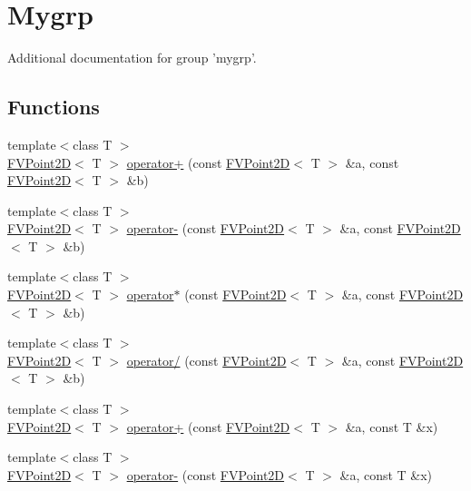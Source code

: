 \hypertarget{group__mygrp}{
\section{Mygrp}
\label{d5/d04/group__mygrp}
}


Additional documentation for group 'mygrp'.  


\subsection*{Functions}
\begin{DoxyCompactItemize}
\item 
{\footnotesize template$<$class T $>$ }\\\hyperlink{classFVPoint2D}{FVPoint2D}$<$ T $>$ \hyperlink{group__mygrp_ga62bcbe7f8a0a6b8f5a3197cb13bb77cf}{operator+} (const \hyperlink{classFVPoint2D}{FVPoint2D}$<$ T $>$ \&a, const \hyperlink{classFVPoint2D}{FVPoint2D}$<$ T $>$ \&b)
\item 
{\footnotesize template$<$class T $>$ }\\\hyperlink{classFVPoint2D}{FVPoint2D}$<$ T $>$ \hyperlink{group__mygrp_ga7d5cb24f219876bf12dc09b7bf61aced}{operator-\/} (const \hyperlink{classFVPoint2D}{FVPoint2D}$<$ T $>$ \&a, const \hyperlink{classFVPoint2D}{FVPoint2D}$<$ T $>$ \&b)
\item 
{\footnotesize template$<$class T $>$ }\\\hyperlink{classFVPoint2D}{FVPoint2D}$<$ T $>$ \hyperlink{group__mygrp_gadbed70591d9eda691e7b13d65522442a}{operator$\ast$} (const \hyperlink{classFVPoint2D}{FVPoint2D}$<$ T $>$ \&a, const \hyperlink{classFVPoint2D}{FVPoint2D}$<$ T $>$ \&b)
\item 
{\footnotesize template$<$class T $>$ }\\\hyperlink{classFVPoint2D}{FVPoint2D}$<$ T $>$ \hyperlink{group__mygrp_ga2744005a9d13a03dbd598b60efb9e886}{operator/} (const \hyperlink{classFVPoint2D}{FVPoint2D}$<$ T $>$ \&a, const \hyperlink{classFVPoint2D}{FVPoint2D}$<$ T $>$ \&b)
\item 
{\footnotesize template$<$class T $>$ }\\\hyperlink{classFVPoint2D}{FVPoint2D}$<$ T $>$ \hyperlink{group__mygrp_gac45bd75690254ff12861d49e8f099eef}{operator+} (const \hyperlink{classFVPoint2D}{FVPoint2D}$<$ T $>$ \&a, const T \&x)
\item 
{\footnotesize template$<$class T $>$ }\\\hyperlink{classFVPoint2D}{FVPoint2D}$<$ T $>$ \hyperlink{group__mygrp_ga790238a5d379903700a9ca768581f476}{operator-\/} (const \hyperlink{classFVPoint2D}{FVPoint2D}$<$ T $>$ \&a, const T \&x)

\end{DoxyCompactItemize}
